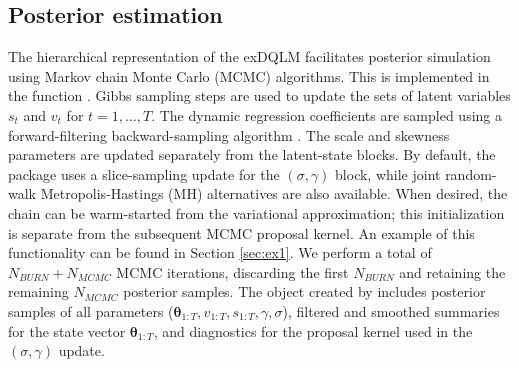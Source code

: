 \documentclass[jss]{jss}
\begin{document}
\subsection{Posterior estimation}

The hierarchical representation of the exDQLM facilitates posterior simulation using Markov chain Monte Carlo (MCMC) algorithms. This is implemented in the function . Gibbs sampling steps are used to update the sets of latent variables $s_t$ and $v_t$ for $t=1,\dots,T$. The dynamic regression coefficients are sampled using a forward-filtering backward-sampling algorithm \citep{carter1994gibbs,fruhwirth1994data}. The scale and skewness parameters are updated separately from the latent-state blocks. By default, the package uses a slice-sampling update for the $(\sigma,\gamma)$ block, while joint random-walk Metropolis-Hastings (MH) alternatives are also available. When desired, the chain can be warm-started from the variational approximation; this initialization is separate from the subsequent MCMC proposal kernel. An example of this functionality can be found in Section \ref{sec:ex1}. We perform a total of $N_{BURN} + N_{MCMC}$ MCMC iterations, discarding the first $N_{BURN}$ and retaining the remaining $N_{MCMC}$ posterior samples. The object created by  includes posterior samples of all parameters ($\boldsymbol{\theta}_{1:T},v_{1:T},s_{1:T},\gamma,\sigma$), filtered and smoothed summaries for the state vector $\boldsymbol{\theta}_{1:T}$, and diagnostics for the proposal kernel used in the $(\sigma,\gamma)$ update.
\end{document}
